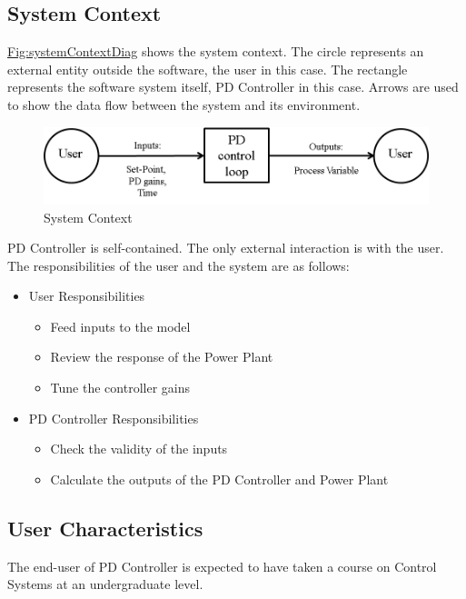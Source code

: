 \documentclass[12pt]{article}
\begin{document}
\subsection{System Context}
\label{Sec:SysContext}
\hyperref[Figure:systemContextDiag]{Fig:systemContextDiag} shows the system context. The circle represents an external entity outside the software, the user in this case. The rectangle represents the software system itself, PD Controller in this case. Arrows are used to show the data flow between the system and its environment.

\begin{figure}
\begin{center}
\includegraphics[width=\textwidth]{../../../datafiles/PDController/Fig_SystemContext.png}
\caption{System Context}
\label{Figure:systemContextDiag}
\end{center}
\end{figure}
PD Controller is self-contained. The only external interaction is with the user. The responsibilities of the user and the system are as follows:

\begin{itemize}
\item{User Responsibilities}
\begin{itemize}
\item{Feed inputs to the model}
\item{Review the response of the Power Plant}
\item{Tune the controller gains}
\end{itemize}
\item{PD Controller Responsibilities}
\begin{itemize}
\item{Check the validity of the inputs}
\item{Calculate the outputs of the PD Controller and Power Plant}
\end{itemize}
\end{itemize}
\subsection{User Characteristics}
\label{Sec:UserChars}
The end-user of PD Controller is expected to have taken a course on Control Systems at an undergraduate level.
\end{document}
